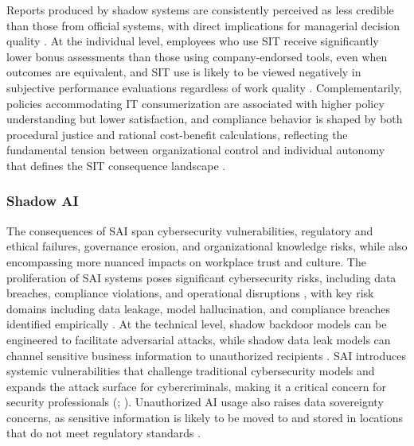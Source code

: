 \documentclass[12pt,oneside]{article}
\begin{document}
Reports produced by shadow systems are consistently perceived as less credible than those from official systems, with direct implications for managerial decision quality \citep[106]{myers2017impact}. At the individual level, employees who use \ac{SIT} receive significantly lower bonus assessments than those using company-endorsed tools, even when outcomes are equivalent, and \ac{SIT} use is likely to be viewed negatively in subjective performance evaluations regardless of work quality \citep[30]{allen2019shadow}. Complementarily, policies accommodating \ac{IT} consumerization are associated with higher policy understanding but lower satisfaction, and compliance behavior is shaped by both procedural justice and rational cost-benefit calculations, reflecting the fundamental tension between organizational control and individual autonomy that defines the \ac{SIT} consequence landscape \citep[1]{lueker2016consumerization}.

\subsubsection{Shadow AI}

The consequences of \ac{SAI} span cybersecurity vulnerabilities, regulatory and ethical failures, governance erosion, and organizational knowledge risks, while also encompassing more nuanced impacts on workplace trust and culture. The proliferation of \ac{SAI} systems poses significant cybersecurity risks, including data breaches, compliance violations, and operational disruptions \citep[1]{whitford2025aidriven}, with key risk domains including data leakage, model hallucination, and compliance breaches identified empirically \citep[1136]{raizada2026shadowai}. At the technical level, shadow backdoor models can be engineered to facilitate adversarial attacks, while shadow data leak models can channel sensitive business information to unauthorized recipients \citep[973]{puthal2025shadowai}. \ac{SAI} introduces systemic vulnerabilities that challenge traditional cybersecurity models and expands the attack surface for cybercriminals, making it a critical concern for security professionals (\citealp[1]{ross2025shadowai}; \citealp[5]{balogun2025ethical}). Unauthorized \ac{AI} usage also raises data sovereignty concerns, as sensitive information is likely to be moved to and stored in locations that do not meet regulatory standards \citep[2]{puthal2025shadowai}.
\end{document}
